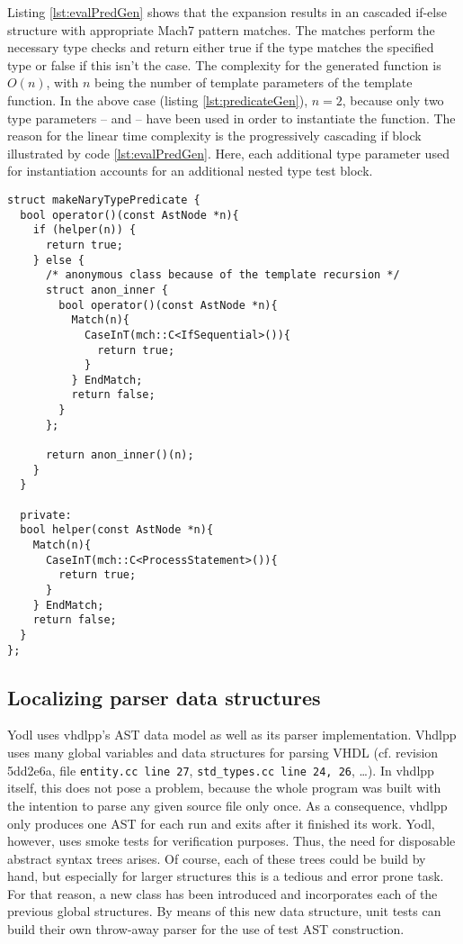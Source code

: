 Listing \ref{lst:evalPredGen} shows that the expansion results in an
cascaded if-else structure with appropriate Mach7 pattern matches. The
matches perform the necessary type checks and return either true if the
type matches the specified type or false if this isn't the case. The
complexity for the generated function is \(O(n)\), with \(n\) being
the number of template parameters of the 
template function. In the above case (listing \ref{lst:predicateGen}),
\(n = 2\), because only two type parameters -- 
and  -- have been used in order to instantiate the
function. The reason for the linear time complexity is the
progressively cascading if block illustrated by code
\ref{lst:evalPredGen}. Here, each additional type parameter used for
instantiation accounts for an additional nested type test block.
%
\begin{lstlisting}[style=c++,caption={Compile time evaluation of
      makeNaryTypePredicate},label={lst:evalPredGen}]
struct makeNaryTypePredicate {
  bool operator()(const AstNode *n){
    if (helper(n)) {
      return true;
    } else {
      /* anonymous class because of the template recursion */
      struct anon_inner {
        bool operator()(const AstNode *n){
          Match(n){
            CaseInT(mch::C<IfSequential>()){
              return true;
            }
          } EndMatch;
          return false;
        }
      };

      return anon_inner()(n);
    }
  }

  private:
  bool helper(const AstNode *n){
    Match(n){
      CaseInT(mch::C<ProcessStatement>()){
        return true;
      }
    } EndMatch;
    return false;
  }
};
\end{lstlisting}
\subsection{Localizing parser data structures}

Yodl uses vhdlpp's AST data model as well as its parser
implementation. Vhdlpp uses many global variables and data
structures for parsing VHDL (cf. \cite{VHDLPPREPO} revision 5dd2e6a, file
\texttt{entity.cc line 27}, \texttt{std_types.cc line 24, 26},
\ldots). In vhdlpp itself, this
does not pose a problem, because the whole program was built with the
intention to parse any given source file only once. As a consequence,
vhdlpp only produces one AST for each run and exits after it finished its
work. Yodl, however, uses smoke tests for verification
purposes. Thus, the need for disposable abstract syntax trees
arises. Of course, each of these trees could be build by hand, but
especially for larger structures this is a tedious and error prone
task. For that reason, a new class  has been
introduced and incorporates each of the previous global
structures. By means of this new data structure, unit tests can build
their own throw-away parser for the use of test AST construction.

